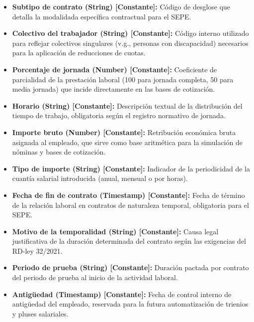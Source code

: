 \begin{itemize}
    \item \textbf{Subtipo de contrato (String) [Constante]:} Código de desglose que detalla la modalidada específica contractual para el SEPE.
    \item \textbf{Colectivo del trabajador (String) [Constante]:} Código interno utilizado para reflejar colectivos singulares (v.g., personas con discapacidad) necesarios para la aplicación de reducciones de cuotas.
    \item \textbf{Porcentaje de jornada (Number) [Constante]:} Coeficiente de parcialidad de la prestación laboral (100 para jornada completa, 50 para media jornada) que incide directamente en las bases de cotización.
    \item \textbf{Horario (String) [Constante]:} Descripción textual de la distribución del tiempo de trabajo, obligatoria según el registro normativo de jornada.
    \item \textbf{Importe bruto (Number) [Constante]:} Retribución económica bruta asignada al empleado, que sirve como base aritmética para la simulación de nóminas y bases de cotización.
    \item \textbf{Tipo de importe (String) [Constante]:} Indicador de la periodicidad de la cuantía salarial introducida (anual, mensual o por horas).
    \item \textbf{Fecha de fin de contrato (Timestamp) [Constante]:} Fecha de término de la relación laboral en contratos de naturaleza temporal, obligatoria para el SEPE.
    \item \textbf{Motivo de la temporalidad (String) [Constante]:} Causa legal justificativa de la duración determinada del contrato según las exigencias del RD-ley 32/2021.
    \item \textbf{Periodo de prueba (String) [Constante]:} Duración pactada por contrato del periodo de prueba al inicio de la actividad laboral.
    \item \textbf{Antigüedad (Timestamp) [Constante]:} Fecha de control interno de antigüedad del empleado, reservada para la futura automatización de trienios y pluses salariales.
\end{itemize}

